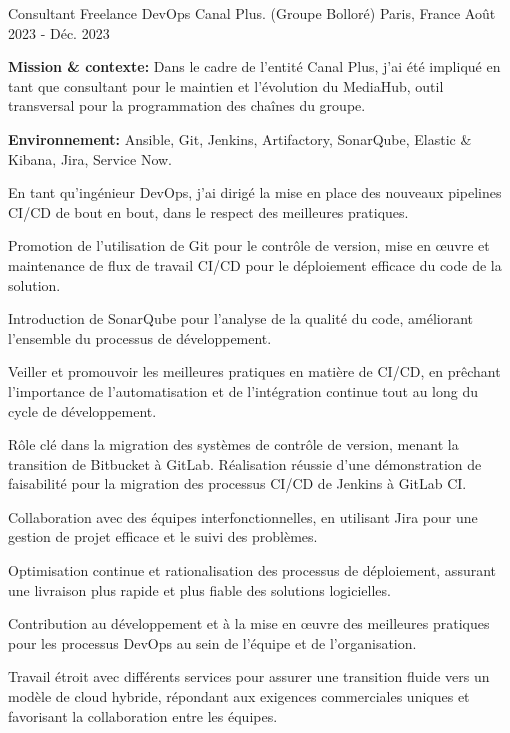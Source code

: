 \begin{cventries}
{\begin{cvitems}
{%
\cventry
{Consultant Freelance DevOps} %
{Canal Plus. (Groupe Bolloré)} %
{Paris, France} %
{Août 2023 - Déc. 2023} %
{
  \begin{cvitems} %
    \item {\textbf{Mission \& contexte:} Dans le cadre de l'entité Canal Plus, j'ai été impliqué en tant que consultant pour le maintien et l'évolution du MediaHub, outil transversal pour la programmation des chaînes du groupe.}
    \item {\textbf{Environnement:} Ansible, Git, Jenkins, Artifactory, SonarQube, Elastic \& Kibana, Jira, Service Now.}
    \item {En tant qu'ingénieur DevOps, j'ai dirigé la mise en place des nouveaux pipelines CI/CD de bout en bout, dans le respect des meilleures pratiques.}
    \item {Promotion de l'utilisation de Git pour le contrôle de version, mise en œuvre et maintenance de flux de travail CI/CD pour le déploiement efficace du code de la solution.}
    \item {Introduction de SonarQube pour l'analyse de la qualité du code, améliorant l'ensemble du processus de développement.}
    \item {Veiller et promouvoir les meilleures pratiques en matière de CI/CD, en prêchant l'importance de l'automatisation et de l'intégration continue tout au long du cycle de développement.}
    \item {Rôle clé dans la migration des systèmes de contrôle de version, menant la transition de Bitbucket à GitLab. Réalisation réussie d'une démonstration de faisabilité pour la migration des processus CI/CD de Jenkins à GitLab CI.}
    \item {Collaboration avec des équipes interfonctionnelles, en utilisant Jira pour une gestion de projet efficace et le suivi des problèmes.}
    \item {Optimisation continue et rationalisation des processus de déploiement, assurant une livraison plus rapide et plus fiable des solutions logicielles.}
    \item {Contribution au développement et à la mise en œuvre des meilleures pratiques pour les processus DevOps au sein de l'équipe et de l'organisation.}
    \item {Travail étroit avec différents services pour assurer une transition fluide vers un modèle de cloud hybride, répondant aux exigences commerciales uniques et favorisant la collaboration entre les équipes.}
  \end{cvitems}        
}

}
\end{cvitems}}
\end{cventries}
